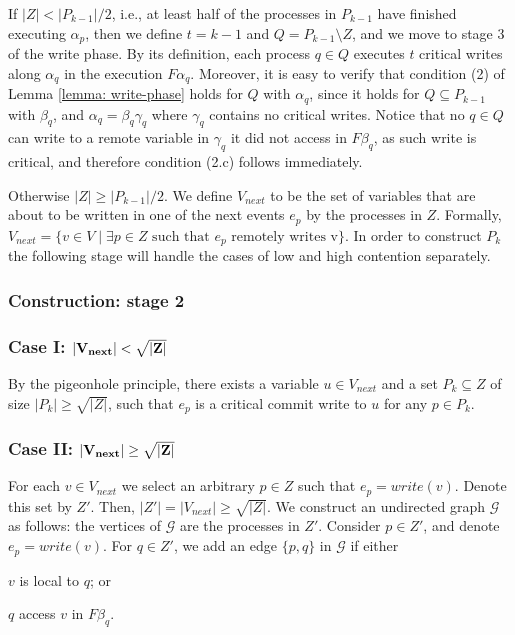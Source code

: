 If $|Z|<|P_{k-1}|/2$, i.e., at least half of the processes in $P_{k-1}$ have finished executing $\alpha_p$, then we define $t=k-1$ and $Q = P_{k-1} \setminus Z$, and we move to stage 3 of the write phase.
By its definition, each process $q \in Q$ executes $t$ critical writes along $\alpha_q$ in the execution $F \alpha_q$. Moreover, it is easy to verify that condition (2) of Lemma \ref{lemma: write-phase} holds for $Q$ with $\alpha_q$, since it holds for $Q \subseteq P_{k-1}$ with $\beta_q$, and $\alpha_q = \beta_q \gamma_q$ where $\gamma_q$ contains no critical writes. Notice that no $q \in Q$ can write to a remote variable in $\gamma_q$ it did not access in $F \beta_q$, as such write is critical, and therefore condition (2.c) follows immediately.

Otherwise $|Z| \geq |P_{k-1}|/2$. We define $V_{next}$ to be the set of variables that are about to be written in one of the next events $e_p$ by the processes in $Z$. Formally, $V_{next} = \{v \in V \mid \exists p \in Z \text{ such that } e_p \text{ remotely writes v}\}$. In order to construct $P_k$ the following stage will handle the cases of low and high contention separately.


\subsubsection{Construction: stage 2}


\subsubsection*{\hspace{5mm} Case I: $\bf |V_{next}| < \sqrt{|Z|}$}

By the pigeonhole principle, there exists a variable $u \in V_{next}$ and a set $P_k \subseteq Z$ of size $|P_k| \geq \sqrt{|Z|}$, such that $e_p$ is a critical commit write to $u$ for any $p \in P_k$.


\subsubsection*{\hspace{5mm} Case II: $\bf |V_{next}| \geq \sqrt{|Z|}$}

For each $v \in V_{next}$ we select an arbitrary $p \in Z$ such that $e_p = write(v)$. Denote this set by $Z'$. Then, $|Z'|=|V_{next}| \geq \sqrt{|Z|}$.
We construct an undirected graph $\mathcal{G}$ as follows: the vertices of $\mathcal{G}$ are the processes in $Z'$. Consider $p \in Z'$, and denote $e_p = write(v)$. For $q \in Z'$, we add an edge $\{p,q\}$ in $\mathcal{G}$ if either
\begin{inparaenum}
	\item $v$ is local to $q$; or
	\item $q$ access $v$ in $F \beta_q$.
\end{inparaenum}

